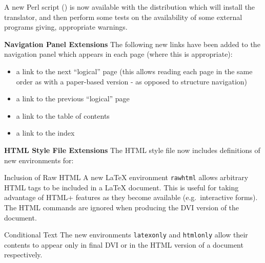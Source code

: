 \begin{htmllist}
A new Perl script () is now available with the distribution
which will install the translator, and then perform some tests on the
availability
of some external
programs giving, appropriate warnings.
\item[\textbf{Navigation Panel Extensions}]
The following new links have been added to the navigation panel which
appears in each page
(where this is appropriate):
\begin{itemize}
\item a link to the next ``logical'' page (this allows reading each
page in the same order as with a paper-based version - as opposed to
structure navigation)
\item a link to the previous ``logical'' page 
\item a link to the table of contents
\item a link to the index 
\end{itemize}
\item[\textbf{HTML Style File Extensions}]
The HTML style file  now includes definitions of new 
environments for:
\begin{htmllist}
\item[Inclusion of Raw HTML]
A new LaTeX environment \texttt{rawhtml} allows
arbitrary
HTML tags to be included in a LaTeX document. This is useful for
taking
advantage of HTML+ features as they become available (e.g.\ interactive
forms).
The HTML commands are ignored when producing the DVI version of the
document.
\label{sec:cond}
\item[Conditional Text]
The new environments \texttt{latexonly} and \texttt{htmlonly} allow their
contents to appear only in final DVI or in the HTML version of a
document respectively. 


\end{htmllist}
\end{htmllist}
